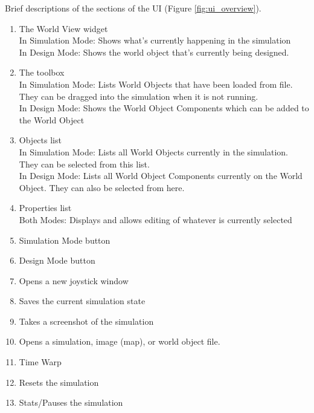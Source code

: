  Brief descriptions of the sections of the UI (Figure \ref{fig:ui_overview}).
 \begin{enumerate}
 	\item The World View widget\\
 	In Simulation Mode: Shows what's currently happening in the simulation\\
 	In Design Mode: Shows the world object that's currently being designed.
 	\item The toolbox\\
 	In Simulation Mode: Lists World Objects that have been loaded from file. They can be dragged into the simulation when it is not running.\\
 	In Design Mode: Shows the World Object Components which can be added to the World Object
 	\item Objects list\\
 	In Simulation Mode: Lists all World Objects currently in the simulation. They can be selected from this list.\\
 	In Design Mode: Lists all World Object Components currently on the World Object. They can also be selected from here.
 	\item Properties list\\
 	Both Modes: Displays and allows editing of whatever is currently selected
 	\item Simulation Mode button
 	\item Design Mode button
 	\item Opens a new joystick window
 	\item Saves the current simulation state
 	\item Takes a screenshot of the simulation
 	\item Opens a simulation, image (map), or world object file.
 	\item Time Warp
 	\item Resets the simulation
 	\item Stats/Pauses the simulation
 \end{enumerate}
 

